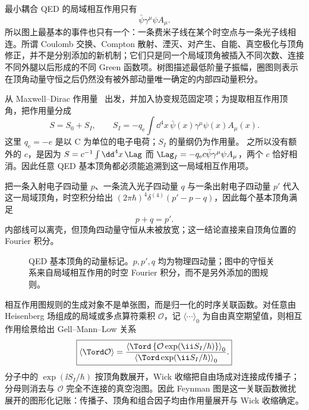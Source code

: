 
最小耦合 QED 的局域相互作用只有
\[
\bar\psi\gamma^\mu\psi A_\mu .
\]
所以图上最基本的事件也只有一个：一条费米子线在某个时空点与一条光子线相连。所谓 Coulomb 交换、Compton 散射、湮灭、对产生、自能、真空极化与顶角修正，并不是分别添加的新机制；它们只是同一个局域顶角被插入不同次数、连接不同外腿以后形成的不同 Green 函数项。树图描述最低阶量子振幅，圈图则表示在顶角动量守恒之后仍然没有被外部动量唯一确定的内部四动量积分。


从 Maxwell--Dirac 作用量~ 出发，并加入协变规范固定项；为提取相互作用顶角，把作用量分成
\begin{equation}
 S=S_0+S_I,
 \qquad
 S_I=-q_{\mathrm e}\int\dd^4 x\,
 \bar\psi(x)\gamma^\mu\psi(x)A_\mu(x).
 \label{eq:qed-S0-SI-dp7}
\end{equation}
这里 $q_{\mathrm e}=-e$ 是以 C 为单位的电子电荷；$S_I$ 的量纲仍为作用量。 之所以没有额外的 $c$，是因为
$S=c^{-1}\int\dd^4 x\,\Lag$ 而
$\Lag_I=-q_{\mathrm e} c\bar\psi\gamma^\mu\psi A_\mu$，两个 $c$ 恰好相消。因此任意 QED 基本顶角都必须能追溯到这一局域相互作用项。

把一条入射电子四动量 $p$、一条流入光子四动量 $q$ 与一条出射电子四动量 $p'$ 代入这一局域顶角，时空积分给出 $(2\pi\hbar)^4\delta^{(4)}(p'-p-q)$，因此每个基本顶角满足
\begin{equation}
 p+q=p'.
 \label{eq:qed-vertex-momentum-conservation-dp68}
\end{equation}
内部线可以离壳，但顶角四动量守恒从未被放宽；这一结论直接来自顶角位置的 Fourier 积分。

\begin{figure}[htbp]
 \centering
 
 \caption{QED 基本顶角的动量标记。$p,p',q$ 均为物理四动量；图中的守恒关系来自局域相互作用的时空 Fourier 积分，而不是另外添加的图规则。}
 \label{fig:qed-elementary-vertex-dp7}
\end{figure}

相互作用图规则的生成对象不是单张图，而是归一化的时序关联函数。对任意由 Heisenberg 场组成的局域或多点算符乘积 $\mathcal O$，记 $\langle\cdots\rangle_0$ 为自由真空期望值，则相互作用绘景给出 Gell--Mann--Low 关系
\begin{equation}
 \boxed{
 \langle\Tord\mathcal O\rangle
 =\frac{
 \left\langle\Tord\left\{\mathcal O
 \exp\!\left(\ii S_I/\hbar\right)\right\}\right\rangle_0}
 {\left\langle\Tord\exp\!\left(\ii S_I/\hbar\right)\right\rangle_0}.}
 \label{eq:qed-gell-mann-low-dp7}
\end{equation}
分子中的 $\exp(\ii S_I/\hbar)$ 按顶角数展开，Wick 收缩把自由场成对连接成传播子；分母则消去与 $\mathcal O$ 完全不连接的真空泡图。因此 Feynman 图是这一关联函数微扰展开的图形化记账：传播子、顶角和组合因子均由作用量展开与 Wick 收缩确定。

